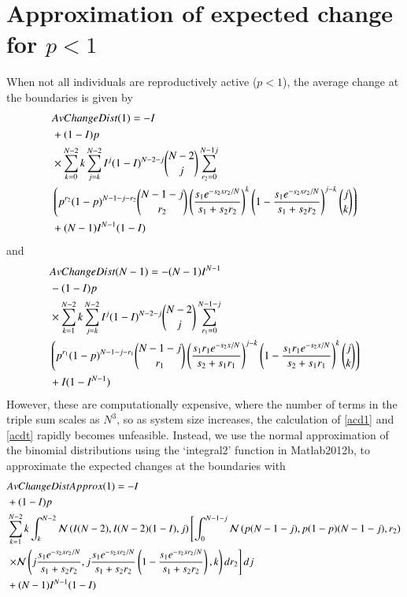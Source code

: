 \section{Approximation of expected change for $p<1$}
\label{app2e}
When not all individuals are reproductively active ($p<1$), the average change at the boundaries is given by
\begin{align}
\label{acd1}
&AvChangeDist(1)=-I \\ 
&+ (1-I)p \notag \\
& \times \sum_{k=0}^{N-2} k \sum_{j=k}^{N-2} I^j(1-I)^{N-2-j}{N-2\choose j} \sum_{r_2=0}^{N-1j} \notag \\
&\left( p^{r_2}(1-p)^{N-1-j-r_2} {N-1-j\choose r_2}\left( \frac{s_1 e^{-s_2xr_2/N}}{s_1+s_2r_2}\right)^k \left(1- \frac{s_1 e^{-s_2xr_2/N}}{s_1+s_2r_2}\right)^{j-k}{j\choose k} \right) \notag \\
&+(N-1)I^{N-1}(1-I) \notag
\end{align}
and
\begin{align}
\label{acdt}
&AvChangeDist(N-1)=-(N-1)I^{N-1}\\& - (1-I)p \notag \\
&\times \sum_{k=1}^{N-2}k\sum_{j=k}^{N-2} I^j(1-I)^{N-2-j} {N-2 \choose j} \sum_{r_1=0}^{N-1-j} \notag \\
&\left( p^{r_1}(1-p)^{N-1-j-r_1} {N-1-j\choose r_1}\left( \frac{s_1r_1 e^{-s_2x/N}}{s_2+s_1r_1}\right)^{j-k} \left(1- \frac{s_1r_1 e^{-s_2x/N}}{s_2+s_1r_1}\right)^k{j\choose k} \right) \notag \\
&+I(1-I^{N-1}) \notag
\end{align}
However, these are computationally expensive, where the number of terms in the triple sum scales as $N^3$, so as system size increases, the calculation of \eqref{acd1} and \eqref{acdt} rapidly becomes unfeasible. Instead, we use the normal approximation of the binomial distributions using the `integral2' function in Matlab2012b, to approximate the expected changes at the boundaries with 
\begin{align}
& AvChangeDistApprox(1)=-I \\
&+(1-I)p \notag \\
&\sum_{k=1}^{N-2} k \int_k^{N-2}  \mathcal{N}\left(I(N-2),I(N-2)(1-I),j\right) \left[ \int_0^{N-1-j} \mathcal{N}\left(p(N-1-j),p(1-p)(N-1-j),r_2\right) \right. \notag \\
&\left. \times \mathcal{N}\left(j\frac{s_1 e^{-s_2xr_2/N}}{s_1+s_2r_2},j\frac{s_1 e^{-s_2xr_2/N}}{s_1+s_2r_2}\left(1-\frac{s_1 e^{-s_2xr_2/N}}{s_1+s_2r_2}\right),k \right) dr_2 \right] dj\notag \\
 &+(N-1)I^{N-1}(1-I)\notag
\end{align}
